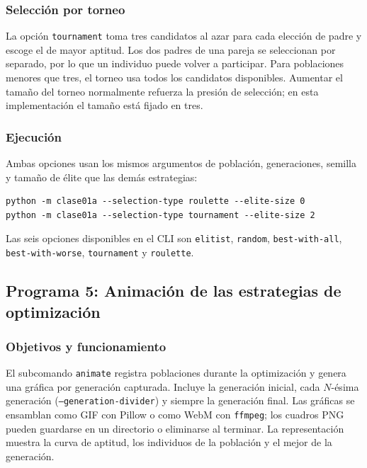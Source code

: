 \documentclass[12pt,a4paper]{article}
\begin{document}
\subsubsection{Selección por torneo}

La opción \texttt{tournament} toma tres candidatos al azar para cada elección
de padre y escoge el de mayor aptitud. Los dos padres de una pareja se
seleccionan por separado, por lo que un individuo puede volver a participar.
Para poblaciones menores que tres, el torneo usa todos los candidatos
disponibles. Aumentar el tamaño del torneo normalmente refuerza la presión de
selección; en esta implementación el tamaño está fijado en tres.

\subsubsection{Ejecución}

Ambas opciones usan los mismos argumentos de población, generaciones, semilla
y tamaño de élite que las demás estrategias:

\begin{verbatim}
python -m clase01a --selection-type roulette --elite-size 0
python -m clase01a --selection-type tournament --elite-size 2
\end{verbatim}

Las seis opciones disponibles en el CLI son \texttt{elitist}, \texttt{random},
\texttt{best-with-all}, \texttt{best-with-worse}, \texttt{tournament} y
\texttt{roulette}.

\subsection{Programa 5: Animación de las estrategias de optimización}

\subsubsection{Objetivos y funcionamiento}

El subcomando \texttt{animate} registra poblaciones durante la optimización y
genera una gráfica por generación capturada. Incluye la generación inicial,
cada \(N\)-ésima generación (\texttt{--generation-divider}) y siempre la
generación final. Las gráficas se ensamblan como GIF con Pillow o como WebM con
\texttt{ffmpeg}; los cuadros PNG pueden guardarse en un directorio o eliminarse
al terminar. La representación muestra la curva de aptitud, los individuos de
la población y el mejor de la generación.
\end{document}
